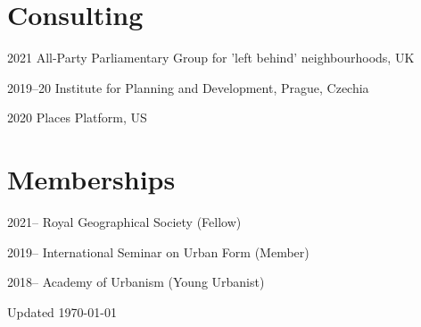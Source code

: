 \documentclass[12pt,a4paper]{report}
\begin{document}
    \section*{Consulting}

    \begin{tablist}

        \item[2021] \tab{}All-Party Parliamentary Group for 'left behind' neighbourhoods, UK
        \item[2019--20] \tab{}Institute for Planning and Development, Prague, Czechia
        \item[2020] \tab{}Places Platform, US

    \end{tablist}


    \section*{Memberships}

    \begin{tablist}

        \item[2021--] \tab{}Royal Geographical Society (Fellow)
        \item[2019--] \tab{}International Seminar on Urban Form (Member)
        \item[2018--] \tab{}Academy of Urbanism (Young Urbanist)

    \end{tablist}

    \begin{center}
        \vfill
        Updated \monthyeardate\today
    \end{center}
\end{document}
